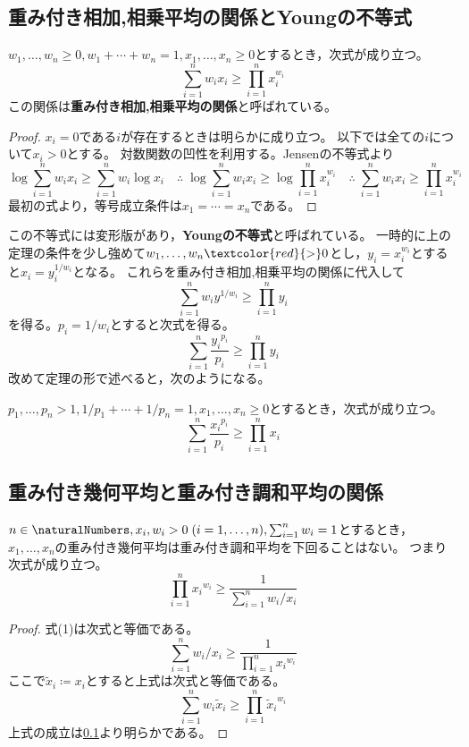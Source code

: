         \subsection{重み付き相加,相乗平均の関係とYoungの不等式}
            \label{重み付き相加,相乗平均の関係とYoungの不等式}
            \begin{shadebox}
                $w_1,\dotsc,w_n\geq 0,w_1+\dotsb+w_n=1,x_1,\dotsc,x_n\geq 0$とするとき，次式が成り立つ。
                \[ \sum_{i=1}^n w_i x_i \geq \prod_{i=1}^n x_i^{w_i} \]
                この関係は\textbf{重み付き相加,相乗平均の関係}と呼ばれている。
            \end{shadebox}
            \begin{proof}
                $x_i=0$である$i$が存在するときは明らかに成り立つ。
                以下では全ての$i$について$x_i>0$とする。
                対数関数の凹性を利用する。Jensenの不等式より
                \[ \log\sum_{i=1}^n w_i x_i \geq \sum_{i=1}^n w_i\log x_i \quad \therefore\; \log\sum_{i=1}^n w_i x_i \geq \log\prod_{i=1}^n x_i^{w_i} \quad \therefore\; \sum_{i=1}^n w_i x_i \geq \prod_{i=1}^n x_i^{w_i} \]
                最初の式より，等号成立条件は$x_1=\dotsb=x_n$である。
            \end{proof}
            この不等式には変形版があり，\textbf{Youngの不等式}と呼ばれている。
            一時的に上の定理の条件を少し強めて$w_1,\dotsc,w_n\textcolor{red}{>}0$とし，$y_i=x_i^{w_i}$とすると$x_i=y_i^{1/w_i}$となる。
            これらを重み付き相加,相乗平均の関係に代入して
            \[ \sum_{i=1}^n w_i y^{1/w_i} \geq \prod_{i=1}^n y_i \]
            を得る。$p_i=1/w_i$とすると次式を得る。
            \[ \sum_{i=1}^n \frac{{y_i}^{p_i}}{p_i} \geq \prod_{i=1}^n y_i \]
            改めて定理の形で述べると，次のようになる。\\
            \begin{shadebox}
                $p_1,\dotsc,p_n>1,1/p_1+\dotsb+1/p_n=1,x_1,\dotsc,x_n\geq 0$とするとき，次式が成り立つ。
                \[ \sum_{i=1}^n \frac{{x_i}^{p_i}}{p_i} \geq \prod_{i=1}^n x_i \]
            \end{shadebox}
        \subsection{重み付き幾何平均と重み付き調和平均の関係}
            \begin{shadebox}
                $n\in\naturalNumbers,x_i,w_i>0\;(i=1,\dots,n),\sum_{i=1}^n w_i = 1$とするとき，$x_1,\dots,x_n$の重み付き幾何平均は重み付き調和平均を下回ることはない。
                つまり次式が成り立つ。
                \[ \prod_{i=1}^n {x_i}^{w_i} \geq \frac{1}{\sum_{i=1}^n w_i/x_i} \tag{1} \]
            \end{shadebox}
            \begin{proof}
                式(1)は次式と等価である。
                \[ \sum_{i=1}^n w_i/x_i \geq \frac{1}{\prod_{i=1}^n {x_i}^{w_i}} \]
                ここで$\tilde{x}_i \coloneq x_i$とすると上式は次式と等価である。
                \[ \sum_{i=1}^n w_i\tilde{x}_i \geq \prod_{i=1}^n {\tilde{x}_i}^{w_i} \]
                上式の成立は\ref{重み付き相加,相乗平均の関係とYoungの不等式}より明らかである。
            \end{proof}
